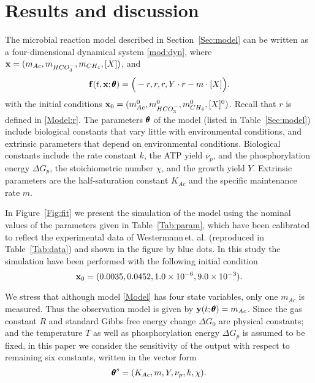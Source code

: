 \documentclass[a4paper, 12pt]{article}
\begin{document}
\section{Results and discussion}\label{Sec:results}
The microbial reaction model described in Section~\ref{Sec:model} can be written as  a four-dimensional dynamical system \eqref{mod:dyn}, where $\mathbf{x} = (m_{Ac}, m_{HCO_3^-},  m_{CH_4}, [X])$, and 
 \begin{equation}\label{Model}
\mathbf{f}(t,\mathbf{x};{\pmb{\theta}}) =\Big(- r,r,r, Y\cdot r -m\cdot [X]\Big).
\end{equation}
with the initial conditions  $\mathbf{x}_0 = (m_{Ac}^0, m_{HCO_3^-}^0,  m_{CH_4}^0, [X]^0)$. Recall that $r$ is defined in \eqref{Model:r}. The  parameters ${\pmb{\theta}}$ of the model (listed in Table~\ref{Sec:model}) include biological constants that vary little with environmental conditions, and extrinsic parameters that depend on environmental conditions. Biological constants include the rate constant $k$, the ATP yield $\nu_p$, and the
phosphorylation energy $\Delta G_p$, the stoichiometric number $\chi$, and the growth yield $Y$. Extrinsic parameters are the half-saturation constant $K_{Ac}$ and the specific maintenance rate $m$. 

\smallskip

In Figure~\ref{Fig:fit} we present the simulation of the model using the nominal values of the parameters given in Table~\ref{Tab:param}, which have been calibrated to reflect the experimental data of Westermann\,et. al. \cite{Westermann1989} (reproduced in  Table~\ref{Tab:data})  and shown in the figure by blue dots. In this study the  simulation have been performed with the following initial condition
\begin{equation}\label{Res:sic}
\mathbf{x}_0= (0.0035, 0.0452, 1.0\times10^{-6}, 9.0\times 10^{-3}).
\end{equation}

\smallskip

We stress that although model \eqref{Model} has four state variables,  only one  $m_{Ac}$ is measured. Thus the observation model is given by $\mathbf{y}(t;{\pmb{\theta}})=m_{Ac}$. 
Since the gas constant $R$  and standard Gibbs free energy change $\Delta G_0$ are physical constants; and  the temperature $T$ as well as phosphorylation energy $\Delta G_p$ is assumed to be fixed, in this paper we consider the sensitivity of the output  with respect to remaining six constants, written in the vector form
\begin{equation}\label{par:sens}
{\pmb{\theta}}^s = (K_{Ac}, m, Y, \nu_p, k, \chi).
\end{equation}
\end{document}
